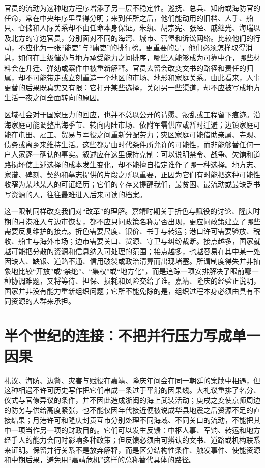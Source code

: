 官员的流动为这种地方程序增添了另一层不稳定性。巡抚、总兵、知府或海防官的任命，常在中央年序里显得分明；来到任所之后，他们能动用的旧档、人手、船只、仓储和人际关系却不由任命本身保证。朱纨、胡宗宪、张经、戚继光、海瑞以及北方的守边官员，分别面对不同的海湾、城市、营堡和诉讼网络。比较他们的行动，不应化为一张“能吏”与“庸吏”的排行榜。更重要的是，他们必须怎样取得消息，如何在上级催办与地方承受能力之间排序，哪些人能够成为可靠中介，哪些材料会在升迁、弹劾或案件中被重新解释。官员去留会改变文书的路径和责任的归属，却不可能带走或立刻重造一个地区的市场、地形和家庭关系。由此看来，人事更替的后果既真实又有限：它打开某些选择，关闭另一些渠道，却不应被写成地方生活一夜之间全面转向的原因。

区域社会对于国家压力的回应，也并不总以公开的请愿、叛乱或工程留下痕迹。沿海家庭可能调整出海季节、转向内陆市场、依附军需供应或暂时迁避；边镇家庭可能在屯田、雇工、贸易与军役之间重新分配劳力；灾区家庭可能借助亲属、寺观、债务或离乡来维持生活。这些都是由时代条件所允许的可能性，而非能够替任何一户人家逐一确认的事实。叙述应在这里保持克制：可以说明禁令、战争、欠饷和道路损坏使上述选择的成本发生变化，却不能擅自指定谁作了哪一种选择。地方志、家谱、碑刻、契约和墓志提供的片段之所以重要，正因为它们有时能把这种可能性收窄为某地某人的可证经历；它们的幸存又提醒我们，最贫困、最流动或最缺乏书写资源的人，往往最难进入后来可读的档案。

这一限制同样改变我们对“改革”的理解。嘉靖时期关于折色与赋役的讨论、隆庆时期的月港准入与边市恢复，都不应只问政策名称是否出现，更应问政策建立了哪些需要反复维护的接点。折色需要尺度、银价、书手与转运；港口许可需要验放、税收、船主与海外市场；边市需要关口、货源、守卫与纠纷裁断。接点越多，国家就越可能把分散的资源和信息纳入可处理的范围；接点越多，也越容易在其中某一处因缺人、缺银、道路不通、信用破裂或政治清算而出现堵塞。所谓制度得失并非抽象地比较“开放”或“禁绝”、“集权”或“地方化”，而是追踪一项安排解决了眼前哪一种协调难题，又将等待、担保、损耗和风险交给了谁。嘉靖、隆庆的经验正说明，国家并非没有能力重新组织问题；它所不能免除的是，组织过程本身必须由具有不同资源的人群来承担。

\section{半个世纪的连接：不把并行压力写成单一因果}

礼议、海防、边警、灾害与赋役在嘉靖、隆庆年间会在同一朝廷的案牍中相遇，但这种相遇不许可历史写作把它们串成一条过于平滑的因果线。大礼议重排了名分、仪式与官僚异议的条件，并不因此造成浙闽的海上武装活动；庚戌之变使京师周边的防务与供给高度紧张，也不能仅因年代接近便被说成华县地震之后资源不足的直接结果；月港许可和隆庆封贡互市分别处理不同海域、不同关口的流动，不能把其中一项当作另一项的财政目的。它们可以发生反馈：中枢人事、军饷、转运和地方经手人的能力会同时影响多种政策；但反馈必须由可辨认的文书、道路或机构联系来证明。保留并行关系不是放弃解释，而是区分结构性条件、触发事件、使能资源和中期后果，避免用“嘉靖危机”这样的总称替代具体的路径。

